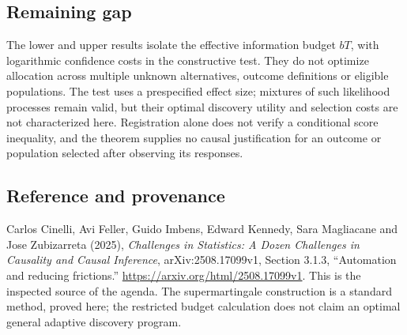 \documentclass[11pt,a4paper]{article}
\begin{document}
\subsection*{Remaining gap}
The lower and upper results isolate the effective information budget $bT$, with logarithmic confidence costs in the constructive test. They do not optimize allocation across multiple unknown alternatives, outcome definitions or eligible populations. The test uses a prespecified effect size; mixtures of such likelihood processes remain valid, but their optimal discovery utility and selection costs are not characterized here. Registration alone does not verify a conditional score inequality, and the theorem supplies no causal justification for an outcome or population selected after observing its responses.

\subsection*{Reference and provenance}
Carlos Cinelli, Avi Feller, Guido Imbens, Edward Kennedy, Sara Magliacane and Jose Zubizarreta (2025), \emph{Challenges in Statistics: A Dozen Challenges in Causality and Causal Inference}, arXiv:2508.17099v1, Section 3.1.3, ``Automation and reducing frictions.'' \url{https://arxiv.org/html/2508.17099v1}. This is the inspected source of the agenda. The supermartingale construction is a standard method, proved here; the restricted budget calculation does not claim an optimal general adaptive discovery program.
\end{document}

